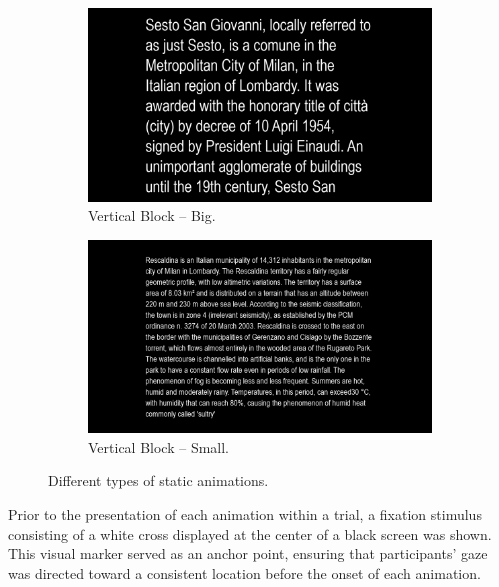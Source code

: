 \documentclass[12pt]{report}
\begin{document}
\begin{figure}[htbp]
    \centering
    \begin{subfigure}[t]{0.45\textwidth}
        \centering
        \includegraphics[width=\linewidth]{Images/Experiment/BIG_static.png}
        \caption{Vertical Block – Big.}
        \label{fig:static_big}
    \end{subfigure}
    \hfill
    \begin{subfigure}[t]{0.45\textwidth}
        \centering
        \includegraphics[width=\linewidth]{Images/Experiment/LIT_static.png}
        \caption{Vertical Block – Small.}
        \label{fig:static_small}
    \end{subfigure}
    \caption{Different types of static animations.}
    \label{fig:statics}
\end{figure}

Prior to the presentation of each animation within a trial, a fixation stimulus consisting of a white cross displayed at the center of a black screen was shown. 
This visual marker served as an anchor point, ensuring that participants’ gaze was directed toward a consistent location before the onset of each animation.
\end{document}
